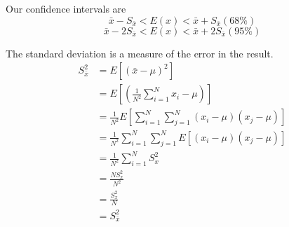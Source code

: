 \documentclass{report}
\begin{document}
Our confidence intervals are 
$$ \bar{x} - S_{\bar{x}} < E(x) < \bar{x} + S_{\bar{x}} (68\%)$$
$$ \bar{x} - 2S_{\bar{x}} < E(x) < \bar{x} + 2S_{\bar{x}} (95\%)$$

The standard deviation is a measure of the error in the result. 
\begin{align*}
S_{\bar{x}}^2	&= E[(\bar{x}-\mu)^2] \\
				&= E[(\frac{1}{N^2} \sum_{i=1}^N x_i - \mu)] \\
				&= \frac{1}{N^2}E\left[ \sum_{i=1}^N \sum_{j=1}^N (x_i - \mu)(x_j - \mu) \right] \\
				&= \frac{1}{N^2} \sum_{i=1}^N \sum_{j=1}^N E\left[ (x_i - \mu)(x_j - \mu)\right] \\
				&= \frac{1}{N^2} \sum_{i=1}^N S_x^2 \\
				&= \frac{N S_x^2}{N^2} \\
				&= \frac{S_x^2}{N} \\
				&= S_{\bar{x}}^2 \\
\end{align*}
\end{document}

